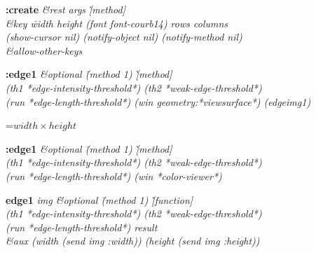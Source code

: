{\newpage
\clearpage
\samepage 
\begin{emtabbing}{\bf :create} 
\it \=\&rest args \` [method]\\  
\>\&key \=width height (font font-courb14) rows columns\\  
\>(show-cursor nil) (notify-object nil) (notify-method nil)\\  
\>\&allow-other-keys
\rm
\end{emtabbing}
}

{\newpage
\clearpage
\samepage 
}

{\newpage
\clearpage
\samepage 
\begin{emtabbing}{\bf :edge1} 
\it \&optional \=(method 1) \`[method]\\  
\>(th1 *edge-intensity-threshold*) (th2 *weak-edge-threshold*)\\  
\>(run *edge-length-threshold*) (win geometry:*viewsurface*) (edgeimg1)
\rm
\end{emtabbing}
}

{\newpage
\clearpage
\samepage 
\setbox\sizebox=\hbox{$width \times height$}\box\sizebox
}

{\newpage
\clearpage
\samepage 
\begin{emtabbing}{\bf :edge1} 
\it \&optional \=(method 1) \`[method]\\  
\>(th1 *edge-intensity-threshold*) (th2 *weak-edge-threshold*)\\  
\>(run *edge-length-threshold*) (win *color-viewer*)
\rm
\end{emtabbing}
}

{\newpage
\clearpage
\samepage 
\begin{emtabbing}{\bf edge1} 
\it img \=\&optional \=(method 1) \`[function]\\  
		    \>\>(th1 *edge-intensity-threshold*)
		    (th2 *weak-edge-threshold*) \\  
		    \>\>(run *edge-length-threshold*)
		    result\\  
	\>\&aux (width (send img :width)) (height (send img :height))
\rm
\end{emtabbing}
}

